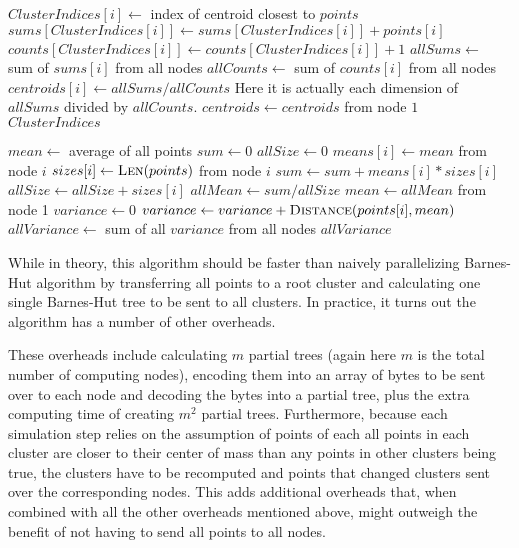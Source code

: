\documentclass{article}
\begin{document}
\begin{algorithm}
\caption{}
\begin{algorithmic}[1]
				\State $ClusterIndices[i] \gets$ index of centroid closest to $points$
			\EndFor
				\State $sums[ClusterIndices[i]] \gets sums[ClusterIndices[i]] + points[i]$
				\State $counts[ClusterIndices[i]] \gets counts[ClusterIndices[i]] + 1$
			\EndFor
					\State $allSums \gets$ sum of $sums[i]$ from all nodes
					\State $allCounts \gets$ sum of $counts[i]$ from all nodes
					\State $centroids[i] \gets allSums / allCounts$ \Comment Here it is actually
					each dimension of $allSums$ divided by $allCounts$.
				\EndFor
			\EndIf
			\State $centroids \gets centroids$ from node $1$
		\EndWhile
		\State \Return $ClusterIndices$
	\EndFunction
\end{algorithmic}
\end{algorithm}


\begin{algorithm}
\caption{}
\begin{algorithmic}[1]
		\State $mean \gets$ average of all points
			\State $sum \gets 0$
			\State $allSize \gets 0$
				\State $means[i] \gets mean$ from node $i$
				\State $sizes[i] \gets \Call{Len}{points}$ from node $i$
				\State $sum \gets sum + means[i] * sizes[i]$
				\State $allSize \gets allSize + sizes[i]$
			\EndFor
			\State $allMean \gets sum / allSize$
		\EndIf
		\State $mean \gets allMean$ from node 1
		\State $variance \gets 0$
			\State $variance \gets variance + \Call{Distance}{points[i], mean}$
		\EndFor
		\State $allVariance \gets$ sum of all $variance$ from all nodes
		\State \Return $allVariance$
	\EndFunction
\end{algorithmic}
\end{algorithm}

While in theory, this algorithm should be faster than naively parallelizing Barnes-Hut algorithm by
transferring all points to a root cluster and calculating one single Barnes-Hut tree to be sent to
all clusters. In practice, it turns out the algorithm has a number of other overheads.

These overheads include calculating \(m\) partial trees (again here \(m\) is the total number of
computing nodes), encoding them into an array of bytes to be sent over to each node and decoding the
bytes into a partial tree, plus the extra computing time of creating \(m^2\) partial trees.
Furthermore, because each simulation step relies on the assumption of points of each all points in
each cluster are closer to their center of mass than any points in other clusters being true, the
clusters have to be recomputed and points that changed clusters sent over the corresponding nodes.
This adds additional overheads that, when combined with all the other overheads mentioned above,
might outweigh the benefit of not having to send all points to all nodes.
\end{document}
